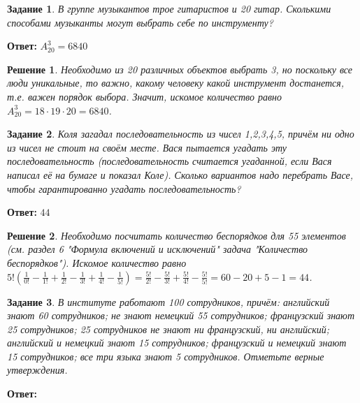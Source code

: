 \documentclass[a4paper,oneside]{memoir}
\newtheorem{task}{Задание}
\newtheorem{solution}{Решение}
\begin{document}
\hrulefill

\begin{task}
	В группе музыкантов трое гитаристов и 20 гитар. Сколькими способами музыканты могут выбрать себе по инструменту?
\end{task}

\textbf{Ответ:} $ A_{20}^3 = 6840 $

\begin{solution}
	Необходимо из 20 различных объектов выбрать 3, но поскольку все люди уникальные, то важно, какому человеку какой инструмент достанется, т.е. важен порядок выбора. Значит, искомое количество равно $ A_{20}^3 = 18\cdot 19\cdot 20 = 6840 $.
\end{solution}

\hrulefill

\begin{task}
	Коля загадал последовательность из чисел 1,2,3,4,5, причём ни одно из чисел не стоит на своём месте. Вася пытается угадать эту последовательность (последовательность считается угаданной, если Вася написал её на бумаге и показал Коле). Сколько вариантов надо перебрать Васе, чтобы гарантированно угадать последовательность?
\end{task}

\textbf{Ответ:} $ 44 $

\begin{solution}
	Необходимо посчитать количество беспорядков для 55 элементов (см. раздел 6 "Формула включений и исключений" задача "Количество беспорядков"). Искомое количество равно $ 5!\left(\frac{1}{0!}-\frac{1}{1!}+\frac{1}{2!}-\frac{1}{3!}+\frac{1}{4!}-\frac{1}{5!}\right) = \frac{5!}{2!}-\frac{5!}{3!}+\frac{5!}{4!}-\frac{5!}{5!} = 60-20+5-1=44 $.
\end{solution}

\hrulefill

\begin{task}
	 В институте работают 100 сотрудников, причём: английский знают 60 сотрудников; не знают немецкий 55 сотрудников; французский знают 25 сотрудников; 25 сотрудников не знают ни французский, ни английский; английский и немецкий знают 15 сотрудников; французский и немецкий знают 15 сотрудников; все три языка знают 5 сотрудников. Отметьте верные утверждения.
\end{task}

\textbf{Ответ:} $  $
\end{document}

